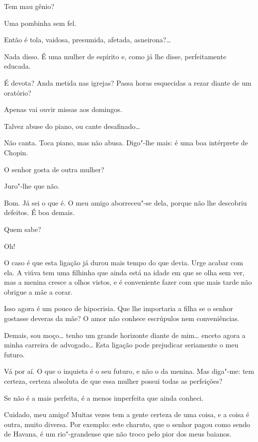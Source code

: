   Tem mau gênio?

  Uma pombinha sem fel.

  Então é tola, vaidosa, presumida, afetada,
asneirona?\ldots{}

   Nada
disso. É uma mulher de espírito e, como já lhe disse, perfeitamente
educada.

  É devota? Anda metida nas igrejas? Passa
horas esquecidas a rezar diante de um oratório?

  Apenas vai ouvir missas aos domingos.

  Talvez abuse do piano, ou cante
desafinado\ldots{}

  Não canta. Toca piano, mas não abusa.
Digo"-lhe mais: é uma boa intérprete de Chopin.

  O senhor gosta de outra mulher?

  Juro"-lhe que não.

  Bom. Já sei o que é. O meu amigo
aborreceu"-se dela, porque não lhe descobriu defeitos. É boa demais.

  Quem sabe?

  Oh!

  O caso é que esta ligação já durou mais tempo
do que devia. Urge acabar com ela. A viúva tem uma filhinha que ainda
está na idade em que se olha sem ver, mas a menina cresce a olhos
vistos, e é conveniente fazer com que mais tarde não obrigue a mãe a
corar.

  Isso agora é um pouco de hipocrisia. Que
lhe importaria a filha se o senhor gostasse deveras da mãe? O amor não
conhece escrúpulos nem conveniências.

  Demais, sou moço\ldots{} tenho um grande horizonte
diante de mim\ldots{} enceto agora a minha carreira de advogado\ldots{} Esta
ligação pode prejudicar seriamente o meu futuro.

  Vá por aí. O que o inquieta é o seu
futuro, e não o da menina. Mas diga"-me: tem certeza, certeza absoluta
de que essa mulher possui todas as perfeições?

  Se não é a mais perfeita, é a menos
imperfeita que ainda conheci.

  Cuidado, meu amigo! Muitas vezes tem a gente certeza de uma
coisa, e a coisa é outra, muito diversa. Por exemplo: este charuto, que
o senhor pagou como sendo de Havana, é um rio"-grandense que não troco
pelo pior dos meus baianos. 

